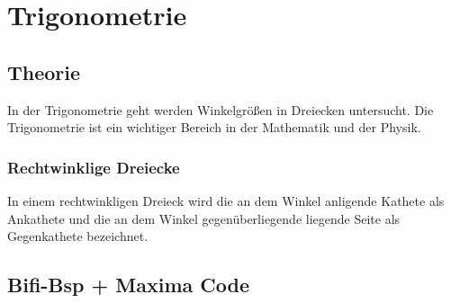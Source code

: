\usepackage{amssymb}
\section{Trigonometrie}
\subsection{Theorie}
In der Trigonometrie geht werden Winkelgrößen in Dreiecken untersucht. Die Trigonometrie ist ein wichtiger Bereich in der Mathematik und der Physik.
\subsubsection{Rechtwinklige Dreiecke}
In einem rechtwinkligen Dreieck wird die an dem Winkel \alpha anligende Kathete als Ankathete und die an dem Winkel \alpha gegenüberliegende liegende Seite als Gegenkathete bezeichnet. 

\subsection{Bifi-Bsp + Maxima Code}